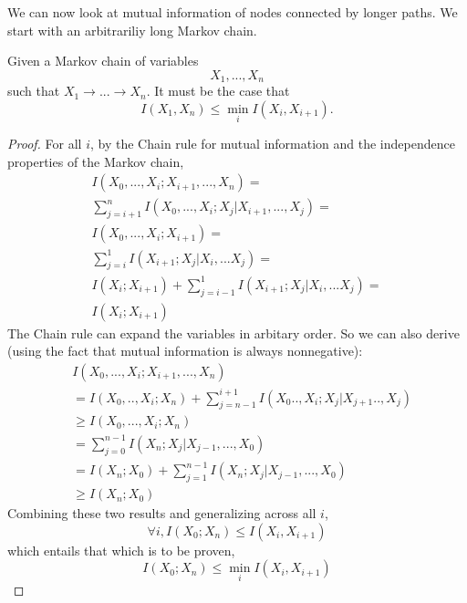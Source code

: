 \documentclass[../thesis.tex]{subfiles}
\begin{document}
We can now look at mutual information of nodes connected
by longer paths.
We start with an arbitrariliy long Markov chain.

\begin{center}
\end{center}

\begin{thm}
  \label{cdpi-thm}
  Given a Markov chain of variables $$X_1, ..., X_n$$
  such that $X_1 \rightarrow ... \rightarrow X_n$.
  It must be the case that
  $$I(X_1,X_n) \leq \min_i I(X_i,X_{i+1}).$$
\end{thm}
\begin{proof}
  \label{cdpi-prf}
  For all $i$, by the Chain rule for mutual information
  and the independence properties of the Markov chain,
  \begin{equation}
    \label{cdpi-prf-eq1}
    \begin{split}
      I(X_0, ..., X_{i} ; X_{i+1},...,X_n) = \\
      \sum_{j=i+1}^{n} I(X_0,...,X_{i}; X_j \vert X_{i+1},...,X_j) = \\
      I(X_0,...,X_{i}; X_{i+1}) = \\
      \sum_{j=i}^{1} I(X_{i+1}; X_{j} \vert X_i,...X_j) = \\
      I(X_i;X_{i+1}) + \sum_{j=i-1}^{1} I(X_{i+1}; X_{j} \vert X_i,...X_j) = \\
      I(X_i;X_{i+1})
    \end{split}
  \end{equation}
  The Chain rule can expand the variables in arbitary order.
  So we can also derive (using the fact that mutual information
  is always nonnegative):
  \begin{equation}
    \label{cdpi-prf-eq2}
    \begin{split}
      & I(X_0, ..., X_{i} ; X_{i+1},...,X_n) \\
      &= I(X_0, .., X_{i} ; X_n) + \sum_{j=n-1}^{i+1} I(X_{0}..,X_{i}; X_j \vert X_{j+1}..,X_j) \\
      &\geq I(X_0, ..., X_{i} ; X_n) \\
      &= \sum_{j = 0}^{n-1} I(X_n ; X_j \vert X_{j-1}, ... , X_0) \\
      &= I(X_n; X_0) + \sum_{j=1}^{n-1} I(X_n; X_j \vert X_{j-1}, ..., X_0) \\
      &\geq I(X_n; X_0)
    \end{split}
  \end{equation}
  Combining these two results and generalizing across all $i$,
  \begin{equation}
    \forall i, I(X_0;X_n) \leq I(X_i,X_{i+1})
  \end{equation}
  which entails that which is to be proven,
  \begin{equation}
    I(X_0;X_n) \leq \min_i I(X_i,X_{i+1})
  \end{equation}
\end{proof}
\end{document}
